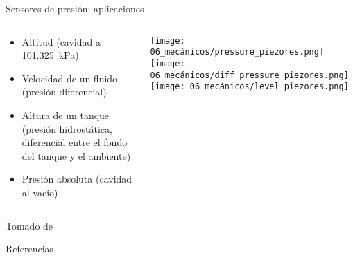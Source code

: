 \documentclass[aspectratio=169]{beamer}
\begin{document}
\begin{frame}{Sensores de presión: aplicaciones}
    \begin{columns}[c, onlytextwidth]
        \begin{column}{0.60\textwidth}
            \begin{itemize}
                \item Altitud (cavidad a \SI{101.325}{\kilo\pascal})
                \item Velocidad de un fluido (presión diferencial)
                \item Altura de un tanque (presión hidrostática, diferencial entre el fondo del tanque y el ambiente) 
                \item Presión absoluta (cavidad al vacío)
            \end{itemize}            
        \end{column}
        \begin{column}{0.40\textwidth}
            \centering
            \texttt{[image: 06\_mecánicos/pressure\_piezores.png]}
            \texttt{[image: 06\_mecánicos/diff\_pressure\_piezores.png]}
            \texttt{[image: 06\_mecánicos/level\_piezores.png]}
        \end{column}
    \end{columns}

    \tiny{Tomado de \cite{ida2013sensors}}
\end{frame}

\begin{frame}{Referencias}
\footnotesize
\printbibliography[heading=none]
\end{frame}
\end{document}
